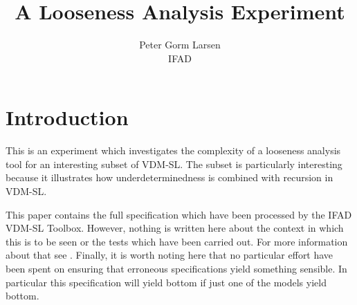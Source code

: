 \documentclass[11pt]{article}
\begin{document}
\title{A Looseness Analysis Experiment}

\author{Peter Gorm Larsen\\ IFAD}

\maketitle

\section{Introduction}

This is an experiment which investigates the complexity of a looseness
analysis tool for an interesting subset of VDM-SL. The subset is
particularly interesting because it illustrates how
underdeterminedness is combined with recursion in VDM-SL.

This paper contains the full specification which have been processed
by the IFAD VDM-SL Toolbox. However, nothing is written here about the
context in which this is to be seen or the tests which have been
carried out. For more information about that see \cite{Larsen94b}.
Finally, it is worth noting here that no particular effort have been spent on
ensuring that erroneous specifications yield something sensible. In
particular this specification will yield bottom if just one of the
models yield bottom.
\newpage

\tableofcontents














\newpage
{}
\printindex
\end{document}
